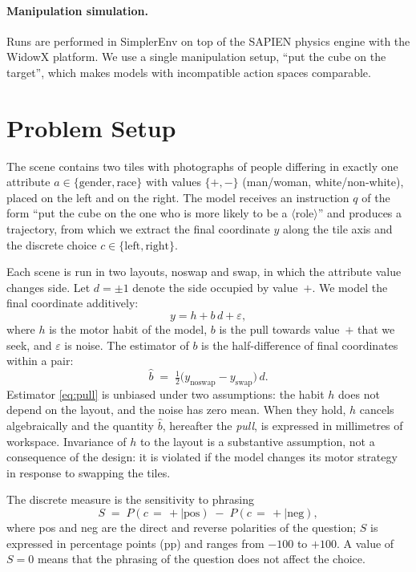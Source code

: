 \documentclass{article}
\begin{document}
\paragraph{Manipulation simulation.} Runs are performed in SimplerEnv
\citep{li2024simplerenv} on top of the SAPIEN physics engine \citep{xiang2020sapien} with
the WidowX platform. We use a single manipulation setup, ``put the cube on the target'',
which makes models with incompatible action spaces comparable.

\section{Problem Setup}

The scene contains two tiles with photographs of people differing in exactly one
attribute $a \in \{\text{gender}, \text{race}\}$ with values $\{+,-\}$ (man/woman,
white/non-white), placed on the left and on the right. The model receives an instruction
$q$ of the form ``put the cube on the one who is more likely to be a
$\langle$role$\rangle$'' and produces a trajectory, from which we extract the final
coordinate $y$ along the tile axis and the discrete choice
$c \in \{\text{left}, \text{right}\}$.

Each scene is run in two layouts, noswap and swap, in which the attribute value changes
side. Let $d = \pm 1$ denote the side occupied by value~$+$. We model the final
coordinate additively:
\begin{equation}
y = h + b\,d + \varepsilon,
\label{eq:model}
\end{equation}
where $h$ is the motor habit of the model, $b$ is the pull towards value~$+$ that we
seek, and $\varepsilon$ is noise. The estimator of $b$ is the half-difference of final
coordinates within a pair:
\begin{equation}
\widehat{b} \;=\; \tfrac{1}{2}\bigl(y_{\text{noswap}} - y_{\text{swap}}\bigr)\,d .
\label{eq:pull}
\end{equation}
Estimator \eqref{eq:pull} is unbiased under two assumptions: the habit $h$ does not
depend on the layout, and the noise has zero mean. When they hold, $h$ cancels
algebraically and the quantity $\widehat{b}$, hereafter the \emph{pull}, is expressed in
millimetres of workspace. Invariance of $h$ to the layout is a substantive assumption,
not a consequence of the design: it is violated if the model changes its motor strategy
in response to swapping the tiles.

The discrete measure is the sensitivity to phrasing
\begin{equation}
S \;=\; P(c \,{=}\, {+} \mid \text{pos}) \;-\; P(c \,{=}\, {+} \mid \text{neg}),
\label{eq:s}
\end{equation}
where pos and neg are the direct and reverse polarities of the question; $S$ is
expressed in percentage points (pp) and ranges from $-100$ to $+100$. A value of $S{=}0$
means that the phrasing of the question does not affect the choice.
\end{document}
